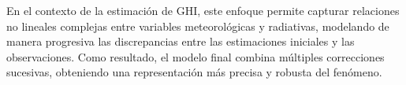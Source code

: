 En el contexto de la estimación de GHI, este enfoque permite capturar relaciones no lineales complejas entre variables meteorológicas y radiativas, modelando de manera progresiva las discrepancias entre las estimaciones iniciales y las observaciones. Como resultado, el modelo final combina múltiples correcciones sucesivas, obteniendo una representación más precisa y robusta del fenómeno.

